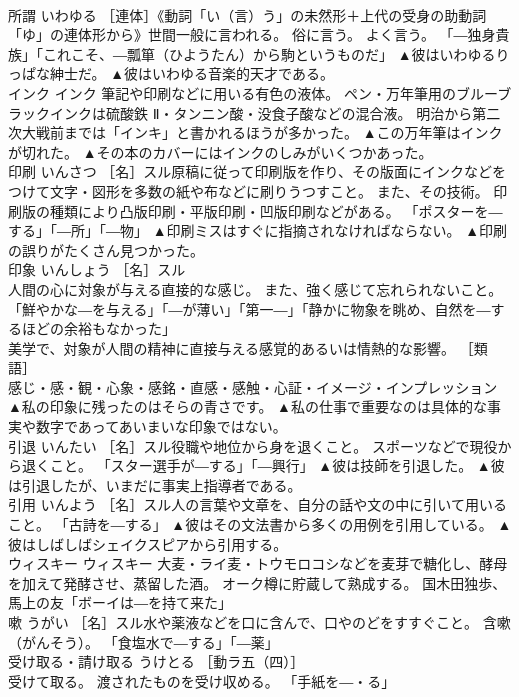 \documentclass[8pt]{extreport}
\begin{document}
\begin{CJK}{UTF8}{min}
\\	所謂	いわゆる	［連体］《動詞「い（言）う」の未然形＋上代の受身の助動詞「ゆ」の連体形から》世間一般に言われる。 俗に言う。 よく言う。 「―独身貴族」「これこそ、―瓢箪（ひようたん）から駒というものだ」	▲彼はいわゆるりっぱな紳士だ。 ▲彼はいわゆる音楽的天才である。
\\	インク	インク	筆記や印刷などに用いる有色の液体。 ペン・万年筆用のブルーブラックインクは硫酸鉄 Ⅱ・タンニン酸・没食子酸などの混合液。 明治から第二次大戦前までは「インキ」と書かれるほうが多かった。	▲この万年筆はインクが切れた。 ▲その本のカバーにはインクのしみがいくつかあった。
\\	印刷	いんさつ	［名］スル原稿に従って印刷版を作り、その版面にインクなどをつけて文字・図形を多数の紙や布などに刷りうつすこと。 また、その技術。 印刷版の種類により凸版印刷・平版印刷・凹版印刷などがある。 「ポスターを―する」「―所」「―物」	▲印刷ミスはすぐに指摘されなければならない。 ▲印刷の誤りがたくさん見つかった。
\\	印象	いんしょう	［名］スル 
\\	人間の心に対象が与える直接的な感じ。 また、強く感じて忘れられないこと。 「鮮やかな―を与える」「―が薄い」「第一―」「静かに物象を眺め、自然を―するほどの余裕もなかった」 
\\	美学で、対象が人間の精神に直接与える感覚的あるいは情熱的な影響。 ［類語］
\\	感じ・感・観・心象・感銘・直感・感触・心証・イメージ・インプレッション	▲私の印象に残ったのはそらの青さです。 ▲私の仕事で重要なのは具体的な事実や数字であってあいまいな印象ではない。
\\	引退	いんたい	［名］スル役職や地位から身を退くこと。 スポーツなどで現役から退くこと。 「スター選手が―する」「―興行」	▲彼は技師を引退した。 ▲彼は引退したが、いまだに事実上指導者である。
\\	引用	いんよう	［名］スル人の言葉や文章を、自分の話や文の中に引いて用いること。 「古詩を―する」	▲彼はその文法書から多くの用例を引用している。 ▲彼はしばしばシェイクスピアから引用する。
\\	ウィスキー	ウィスキー	大麦・ライ麦・トウモロコシなどを麦芽で糖化し、酵母を加えて発酵させ、蒸留した酒。 オーク樽に貯蔵して熟成する。 国木田独歩、馬上の友「ボーイは―を持て来た」	
\\	嗽	うがい	［名］スル水や薬液などを口に含んで、口やのどをすすぐこと。 含嗽（がんそう）。 「食塩水で―する」「―薬」	
\\	受け取る・請け取る	うけとる	［動ラ五（四）］ 
\\	受けて取る。 渡されたものを受け収める。 「手紙を―・る」 

\end{CJK}
\end{document}
